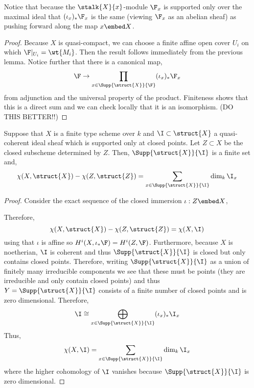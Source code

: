 \documentclass[12pt]{article}
\begin{document}
\begin{rmk}
Notice that because the $\stalk{X}{x}$-module $\F_x$ is supported only over the maximal ideal that $(\iota_x)_* \F_x$ is the same (viewing $\F_x$ as an abelian sheaf) as pushing forward along the map $x \embed X$.
\end{rmk}

\begin{proof}
Because $X$ is quasi-compact, we can choose a finite affine open cover $U_i$ on which $\F|_{U_i} = \wt{M_i}$. Then the result follows immediately from the previous lemma. Notice further that there is a canonical map,
\[ \F \to \prod_{x \in \Supp{\struct{X}}{\F}} (\iota_x)_* \F_x \]
from adjunction and the universal property of the product. Finiteness shows that this is a direct sum and we can check locally that it is an isomorphism. (DO THIS BETTER!!) 
\end{proof}


\begin{prop}
Suppose that $X$ is a finite type scheme over $k$ and $\I \subset \struct{X}$ a quasi-coherent ideal sheaf which is supported only at closed points. Let $Z \subset X$ be the closed subscheme determined by $Z$. Then, $\Supp{\struct{X}}{\I}$ is a finite set and,
\[ \chi(X, \struct{X}) - \chi(Z, \struct{Z}) = \sum_{x \in \Supp{\struct{X}}{\I}} \dim_k \I_x \]
\end{prop}

\begin{proof}
Consider the exact sequence of the closed immersion $\iota : Z \embed X$,
\begin{center}
\end{center}
Therefore,
\[ \chi(X, \struct{X}) - \chi(Z, \struct{Z}) = \chi(X, \I) \]
using that $\iota$ is affine so $H^i(X, \iota_* \F) = H^i(Z, \F)$. 
Furthermore, because $X$ is noetherian, $\I$ is coherent and thus $\Supp{\struct{X}}{\I}$ is closed but only contains closed points. Therefore, writing $\Supp{\struct{X}}{\I}$ as a union of finitely many irreducible components we see that these must be points (they are irreducible and only contain closed points) and thus $Y = \Supp{\struct{X}}{\I}$ consists of a finite number of closed points and is zero dimensional. Therefore, 
\[ \I \cong \bigoplus_{x \in \Supp{\struct{X}}{\I}} (\iota_x)_* \I_x \]
Thus,
\[ \chi(X, \I) = \sum_{x \in \Supp{\struct{X}}{\I}} \dim_k \I_x \]
where the higher cohomology of $\I$ vanishes because $\Supp{\struct{X}}{\I}$ is zero dimensional. 
\end{proof}
\end{document}
